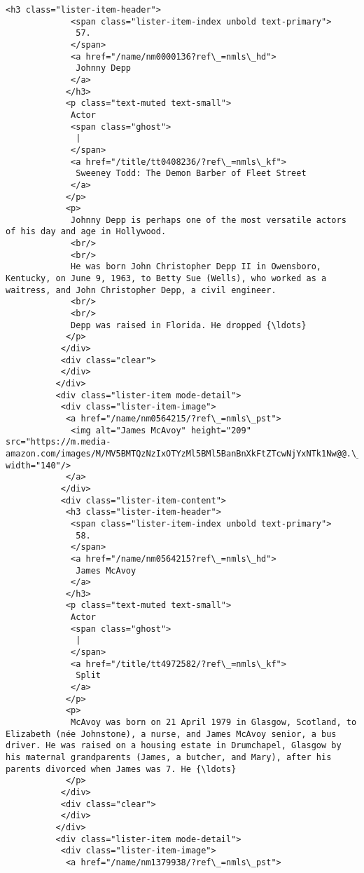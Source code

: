 \documentclass[11pt]{article}
\begin{document}
\begin{Verbatim}[commandchars=\\\{\}]
            <h3 class="lister-item-header">
             <span class="lister-item-index unbold text-primary">
              57.
             </span>
             <a href="/name/nm0000136?ref\_=nmls\_hd">
              Johnny Depp
             </a>
            </h3>
            <p class="text-muted text-small">
             Actor
             <span class="ghost">
              |
             </span>
             <a href="/title/tt0408236/?ref\_=nmls\_kf">
              Sweeney Todd: The Demon Barber of Fleet Street
             </a>
            </p>
            <p>
             Johnny Depp is perhaps one of the most versatile actors of his day and age in Hollywood.
             <br/>
             <br/>
             He was born John Christopher Depp II in Owensboro, Kentucky, on June 9, 1963, to Betty Sue (Wells), who worked as a waitress, and John Christopher Depp, a civil engineer.
             <br/>
             <br/>
             Depp was raised in Florida. He dropped {\ldots}
            </p>
           </div>
           <div class="clear">
           </div>
          </div>
          <div class="lister-item mode-detail">
           <div class="lister-item-image">
            <a href="/name/nm0564215/?ref\_=nmls\_pst">
             <img alt="James McAvoy" height="209" src="https://m.media-amazon.com/images/M/MV5BMTQzNzIxOTYzMl5BMl5BanBnXkFtZTcwNjYxNTk1Nw@@.\_V1\_UY209\_CR10,0,140,209\_AL\_.jpg" width="140"/>
            </a>
           </div>
           <div class="lister-item-content">
            <h3 class="lister-item-header">
             <span class="lister-item-index unbold text-primary">
              58.
             </span>
             <a href="/name/nm0564215?ref\_=nmls\_hd">
              James McAvoy
             </a>
            </h3>
            <p class="text-muted text-small">
             Actor
             <span class="ghost">
              |
             </span>
             <a href="/title/tt4972582/?ref\_=nmls\_kf">
              Split
             </a>
            </p>
            <p>
             McAvoy was born on 21 April 1979 in Glasgow, Scotland, to Elizabeth (née Johnstone), a nurse, and James McAvoy senior, a bus driver. He was raised on a housing estate in Drumchapel, Glasgow by his maternal grandparents (James, a butcher, and Mary), after his parents divorced when James was 7. He {\ldots}
            </p>
           </div>
           <div class="clear">
           </div>
          </div>
          <div class="lister-item mode-detail">
           <div class="lister-item-image">
            <a href="/name/nm1379938/?ref\_=nmls\_pst">

\end{Verbatim}
\end{document}
